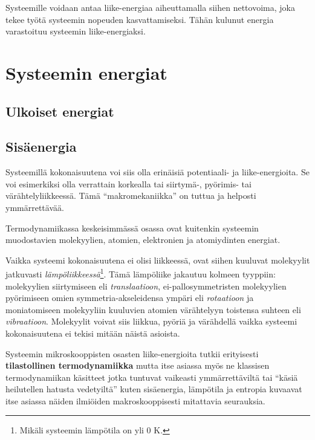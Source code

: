 \documentclass[12pt,a4paper,finnish]{book}
\begin{document}
Systeemille voidaan antaa liike-energiaa aiheuttamalla siihen nettovoima, joka tekee työtä systeemin 
nopeuden kasvattamiseksi. Tähän kulunut energia varastoituu systeemin liike-energiaksi.


\chapter{Systeemin energiat} %

\section{Ulkoiset energiat} %

\section{Sisäenergia} %

Systeemillä kokonaisuutena voi siis olla erinäisiä potentiaali- ja liike-energioita. Se voi esimerkiksi olla verrattain korkealla 
tai siirtymä-, pyörimis- tai värähtelyliikkeessä. Tämä ``makromekaniikka'' on tuttua ja helposti ymmärrettävää.

Termodynamiikassa keskeisimmässä osassa ovat kuitenkin systeemin muodostavien molekyylien, atomien, elektronien ja atomiydinten 
energiat.

Vaikka systeemi kokonaisuutena ei olisi liikkeessä, ovat siihen kuuluvat molekyylit jatkuvasti 
\textit{lämpöliikkeessä}\footnote{Mikäli systeemin lämpötila on yli 0 K.}. Tämä lämpöliike jakautuu kolmeen tyyppiin: molekyylien 
siirtymiseen eli \textit{translaatioon}, ei-pallosymmetristen molekyylien pyörimiseen omien symmetria-akseleidensa ympäri eli 
\textit{rotaatioon} ja moniatomiseen molekyyliin kuuluvien atomien värähtelyyn toistensa suhteen eli \textit{vibraatioon}. 
Molekyylit voivat siis liikkua, pyöriä ja värähdellä vaikka systeemi kokonaisuutena ei tekisi mitään näistä asioista.

Systeemin mikroskooppisten osasten liike-energioita tutkii erityisesti \textbf{tilastollinen termodynamiikka} mutta itse asiassa 
myös ne klassisen termodynamiikan käsitteet jotka tuntuvat vaikeasti ymmärrettäviltä tai ``käsiä heilutellen hatusta vedetyiltä'' 
kuten sisäenergia, lämpötila ja entropia kuvaavat itse asiassa näiden ilmiöiden makroskooppisesti mitattavia seurauksia.
\end{document}
